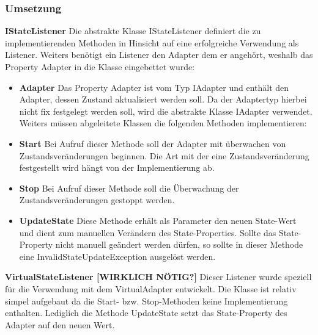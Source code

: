 \subsubsection{Umsetzung}
\textbf{IStateListener}
\newline
Die abstrakte Klasse IStateListener definiert die zu implementierenden Methoden in Hinsicht auf eine erfolgreiche Verwendung als Listener. Weiters benötigt ein Listener den Adapter dem er angehört, weshalb das Property Adapter in die Klasse eingebettet wurde:
\begin{itemize}
\item \textbf{Adapter}
\newline
Das Property Adapter ist vom Typ IAdapter und enthält den Adapter, dessen Zustand aktualisiert werden soll. Da der Adaptertyp hierbei nicht fix festgelegt werden soll, wird die abstrakte Klasse IAdapter verwendet. 
Weiters müssen abgeleitete Klassen die folgenden Methoden implementieren:
\item \textbf{Start}
\newline
Bei Aufruf dieser Methode soll der Adapter mit überwachen von Zustandsveränderungen beginnen. Die Art mit der eine Zustandsveränderung festgestellt wird hängt von der Implementierung ab.
\item \textbf{Stop}
\newline
Bei Aufruf dieser Methode soll die Überwachung der Zustandsveränderungen gestoppt werden.
\item \textbf{UpdateState}
\newline
Diese Methode erhält als Parameter den neuen State-Wert und dient zum manuellen Verändern des State-Properties. Sollte das State-Property nicht manuell geändert werden dürfen, so sollte in dieser Methode eine InvalidStateUpdateException ausgelöst werden.
\end{itemize}

\textbf{VirtualStateListener [WIRKLICH NÖTIG?]}
\newline
Dieser Listener wurde speziell für die Verwendung mit dem VirtualAdapter entwickelt. Die Klasse ist relativ simpel aufgebaut da die Start- bzw. Stop-Methoden keine Implementierung enthalten. Lediglich die Methode UpdateState setzt das State-Property des Adapter auf den neuen Wert.
\newline
\newline

